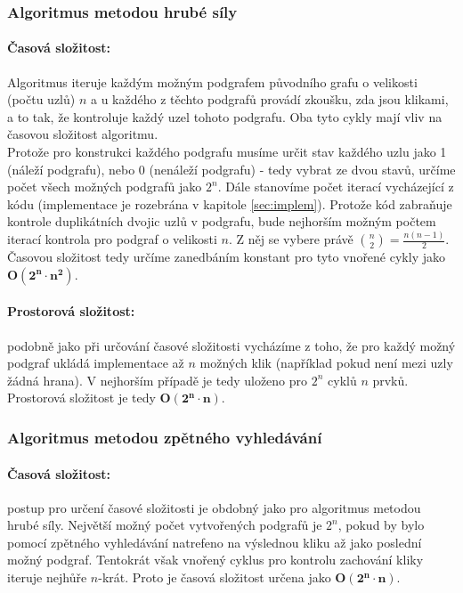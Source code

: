 \documentclass[a4paper]{article}
\begin{document}
        \subsubsection{Algoritmus metodou hrubé síly}
            \paragraph{Časová složitost:} Algoritmus iteruje každým možným podgrafem původního grafu o velikosti (počtu uzlů) $n$ a u každého z těchto podgrafů provádí zkoušku, zda jsou klikami, a to tak, že kontroluje každý uzel tohoto podgrafu. Oba tyto cykly mají vliv na časovou složitost algoritmu.\\[3pt]
            \noindent
            Protože pro konstrukci každého podgrafu musíme určit stav každého uzlu jako 1 (náleží podgrafu), nebo 0 (nenáleží podgrafu) - tedy vybrat ze dvou stavů, určíme počet všech možných podgrafů jako $2^n$. Dále stanovíme počet iterací vycházející z kódu (implementace je rozebrána v kapitole \ref{sec:implem}). Protože kód zabraňuje kontrole duplikátních dvojic uzlů v podgrafu, bude nejhorším možným počtem iterací kontrola pro podgraf o velikosti $n$. Z něj se vybere právě $\binom{n}{2} = \frac{n(n-1)}{2}$.\\[3pt]
            \noindent
            Časovou složitost tedy určíme zanedbáním konstant pro tyto vnořené cykly jako $\mathbf{O(2^n \cdot n^2)}$.

            \paragraph{Prostorová složitost:} podobně jako při určování časové složitosti vycházíme z toho, že pro každý možný podgraf ukládá implementace až $n$ možných klik (například pokud není mezi uzly žádná hrana). V nejhorším případě je tedy uloženo pro $2^n$ cyklů $n$ prvků. Prostorová složitost je tedy $\mathbf{O(2^n \cdot n)}$.

        \subsubsection{Algoritmus metodou zpětného vyhledávání}
            \paragraph{Časová složitost:} postup pro určení časové složitosti je obdobný jako pro algoritmus metodou hrubé síly. Největší možný počet vytvořených podgrafů je $2^n$, pokud by bylo pomocí zpětného vyhledávání natrefeno na výslednou kliku až jako poslední možný podgraf. Tentokrát však vnořený cyklus pro kontrolu zachování kliky iteruje nejhůře $n$-krát. Proto je časová složitost určena jako $\mathbf{O(2^n\cdot n)}$.
\end{document}
